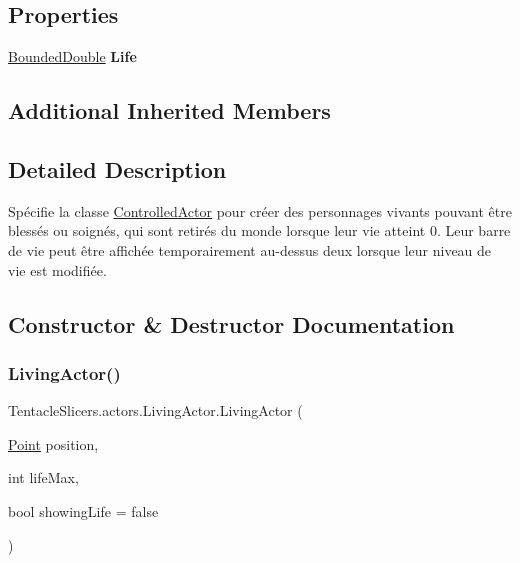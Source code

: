 \subsection*{Properties}
\begin{DoxyCompactItemize}
\item 
\mbox{\label{class_tentacle_slicers_1_1actors_1_1_living_actor_ad8ab547f48d94eefa25b70d0c4d811e5}} 
\hyperlink{class_tentacle_slicers_1_1general_1_1_bounded_double}{Bounded\+Double} {\bfseries Life}
\end{DoxyCompactItemize}
\subsection*{Additional Inherited Members}


\subsection{Detailed Description}
Spécifie la classe \hyperlink{class_tentacle_slicers_1_1actors_1_1_controlled_actor}{Controlled\+Actor} pour créer des personnages vivants pouvant être blessés ou soignés, qui sont retirés du monde lorsque leur vie atteint 0. Leur barre de vie peut être affichée temporairement au-\/dessus d\textquotesingle{}eux lorsque leur niveau de vie est modifiée. 



\subsection{Constructor \& Destructor Documentation}
\mbox{\label{class_tentacle_slicers_1_1actors_1_1_living_actor_ad5c2bea3a216b8b7aba0aa65e1c72e56}} 
\subsubsection{\texorpdfstring{Living\+Actor()}{LivingActor()}}
{\footnotesize\ttfamily Tentacle\+Slicers.\+actors.\+Living\+Actor.\+Living\+Actor (\begin{DoxyParamCaption}\item[{\hyperlink{class_tentacle_slicers_1_1general_1_1_point}{Point}}]{position,  }\item[{int}]{life\+Max,  }\item[{bool}]{showing\+Life = {\ttfamily false} }\end{DoxyParamCaption})}



